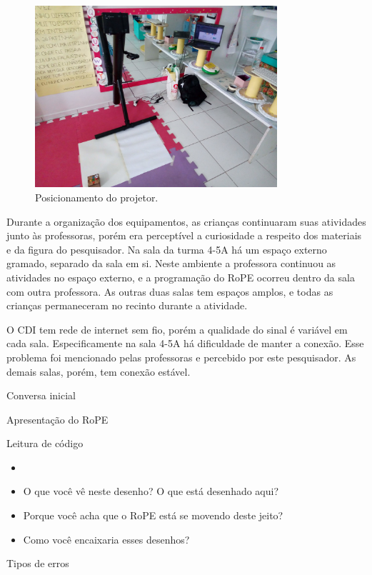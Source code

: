 \begin{figure}[!h]
    \centering
    \includegraphics[width=0.8\textwidth,fbox]{figs/setting_projector.jpg}
    \caption{Posicionamento do projetor.}
    \label{fig:setting}
\end{figure}

Durante a organização dos equipamentos, as crianças continuaram suas atividades junto às professoras, porém era perceptível a curiosidade a respeito dos materiais e da figura do pesquisador. Na sala da turma 4-5A há um espaço externo gramado, separado da sala em si. Neste ambiente a professora continuou as atividades no espaço externo, e a programação do RoPE ocorreu dentro da sala com outra professora. As outras duas salas tem espaços amplos, e todas as crianças permaneceram no recinto durante a atividade.

O CDI tem rede de internet sem fio, porém a qualidade do sinal é variável em cada sala. Especificamente na sala 4-5A há dificuldade de manter a conexão. Esse problema foi mencionado pelas professoras e percebido por este pesquisador. As demais salas, porém, tem conexão estável.

\label{sec:protocolo}
Conversa inicial

Apresentação do RoPE

Leitura de código
\begin{itemize}
\item 
\item O que você vê neste desenho? O que está desenhado aqui?
\item Porque você acha que o RoPE está se movendo deste jeito?
\item Como você encaixaria esses desenhos?
\end{itemize}

Tipos de erros



